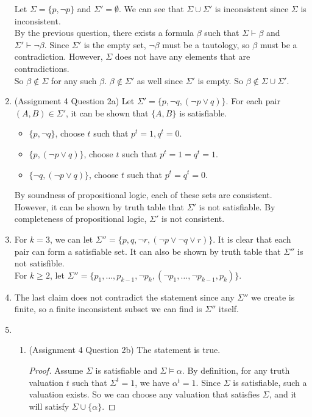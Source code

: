 \documentclass[12pt]{article}
\begin{document}
\begin{enumerate}
        Let $\Sigma=\{p,\neg p\}$ and $\Sigma'=\emptyset$. We can see that $\Sigma\cup\Sigma'$ is inconsistent since $\Sigma$ is inconsistent.\\
        By the previous question, there exists a formula $\beta$ such that $\Sigma\vdash \beta$ and $\Sigma'\vdash \neg\beta$. Since $\Sigma'$ is the empty set, $\neg\beta$ must be a tautology, so $\beta$ must be a contradiction. However, $\Sigma$ does not have any elements that are contradictions.\\
        So $\beta\notin\Sigma$ for any such $\beta$. $\beta\notin\Sigma'$ as well since $\Sigma'$ is empty. So $\beta\notin\Sigma\cup\Sigma'$.
        \item (Assignment 4 Question 2a) Let $\Sigma'=\{p,\neg q, (\neg p\lor q)\}$. For each pair $(A,B)\in\Sigma'$, it can be shown that $\{A,B\}$ is satisfiable.
        \begin{itemize}
            \item $\{p,\neg q\}$, choose $t$ such that $p^t=1, q^t=0$.
            \item $\{p,(\neg p\lor q)\}$, choose $t$ such that $p^t=1=q^t=1$.
            \item $\{\neg q,(\neg p\lor q)\}$, choose $t$ such that $p^t=q^t=0$.
        \end{itemize}
        By soundness of propositional logic, each of these sets are consistent.\\
        However, it can be shown by truth table that $\Sigma'$ is not satisfiable. By completeness of propositional logic, $\Sigma'$ is not consistent.
        \item For $k=3$, we can let $\Sigma''=\{p,q,\neg r, (\neg p\lor \neg q\lor r)\}$. It is clear that each pair can form a satisfiable set. It can also be shown by truth table that $\Sigma''$ is not satisfible.\\
            For $k\geq 2$, let $\Sigma''=\{p_1,\dots, p_{k-1},\neg p_k, (\neg p_1,\dots,\neg p_{k-1}, p_k)\}$.
        \item The last claim does not contradict the statement since any $\Sigma''$ we create is finite, so a finite inconsistent subset we can find is $\Sigma''$ itself.
        \item 
        \begin{enumerate}
            \item (Assignment 4 Question 2b) The statement is true.
            \begin{proof}
                Assume $\Sigma$ is satisfiable and $\Sigma\models\alpha$. By definition, for any truth valuation $t$ such that $\Sigma^t=1$, we have $\alpha^t=1$. Since $\Sigma$ is satisfiable, such a valuation exists. So we can choose any valuation that satisfies $\Sigma$, and it will satisfy $\Sigma\cup\{\alpha\}$.

\end{proof}
\end{enumerate}
\end{enumerate}
\end{document}
